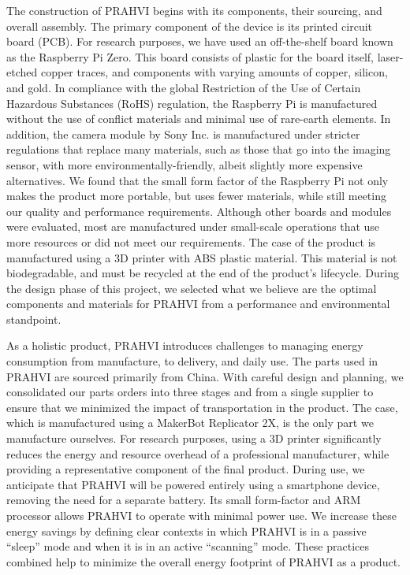 	The construction of PRAHVI begins with its components, their sourcing, and overall assembly. The primary component of the device is its printed circuit board (PCB). For research purposes, we have used an off-the-shelf board known as the Raspberry Pi Zero. This board consists of plastic for the board itself, laser-etched copper traces, and components with varying amounts of copper, silicon, and gold. In compliance with the global Restriction of the Use of Certain Hazardous Substances (RoHS) regulation, the Raspberry Pi is manufactured without the use of conflict materials and minimal use of rare-earth elements. In addition, the camera module by Sony Inc. is manufactured under stricter regulations that replace many materials, such as those that go into the imaging sensor, with more environmentally-friendly, albeit slightly more expensive alternatives. We found that the small form factor of the Raspberry Pi not only makes the product more portable, but uses fewer materials, while still meeting our quality and performance requirements. Although other boards and modules were evaluated, most are manufactured under small-scale operations that use more resources or did not meet our requirements. The case of the product is manufactured using a 3D printer with ABS plastic material. This material is not biodegradable, and must be recycled at the end of the product's lifecycle. During the design phase of this project, we selected what we believe are the optimal components and materials for PRAHVI from a performance and environmental standpoint.
	
	As a holistic product, PRAHVI introduces challenges to managing energy consumption from manufacture, to delivery, and daily use. The parts used in PRAHVI are sourced primarily from China. With careful design and planning, we consolidated our parts orders into three stages and from a single supplier to ensure that we minimized the impact of transportation in the product. The case, which is manufactured using a MakerBot Replicator 2X, is the only part we manufacture ourselves. For research purposes, using a 3D printer significantly reduces the energy and resource overhead of a professional manufacturer, while providing a representative component of the final product. During use, we anticipate that PRAHVI will be powered entirely using a smartphone device, removing the need for a separate battery. Its small form-factor and ARM processor allows PRAHVI to operate with minimal power use. We increase these energy savings by defining clear contexts in which PRAHVI is in a passive “sleep” mode and when it is in an active “scanning” mode. These practices combined help to minimize the overall energy footprint of PRAHVI as a product.
	
